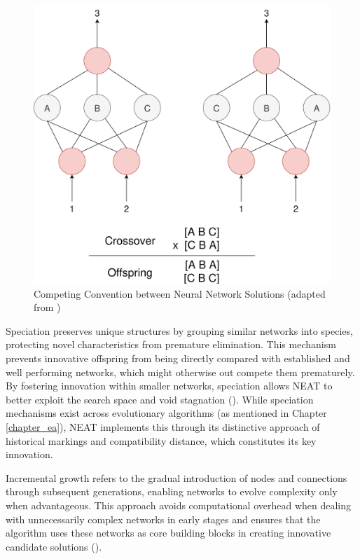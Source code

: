 \parbreak
\begin{figure}[H] %
	\centering %
	\includegraphics[width=\textwidth]{Figures/chapter_ne/ne_competing_convention.png} %
	\caption{Competing Convention between Neural Network Solutions (adapted from \cite{stanley2002evolving})}
	\label{fig:competing_convension} %
\end{figure}

\parbreak\noindent Speciation preserves unique structures by grouping similar networks into species, protecting novel characteristics from premature elimination. This mechanism prevents innovative offspring from being directly compared with established and well performing networks, which might otherwise out compete them prematurely. By fostering innovation within smaller networks, speciation allows NEAT to better exploit the search space and void stagnation (\cite{stanley2002evolving}). While speciation mechanisms exist across evolutionary algorithms (as mentioned in Chapter \ref{chapter_ea}), NEAT implements this through its distinctive approach of historical markings and compatibility distance, which constitutes its key innovation.

\parbreak\noindent Incremental growth refers to the gradual introduction of nodes and connections through subsequent generations, enabling networks to evolve complexity only when advantageous. This approach avoids computational overhead when dealing with unnecessarily complex networks in early stages and ensures that the algorithm uses these networks as core building blocks in creating innovative candidate solutions (\cite{stanley2002evolving}).

